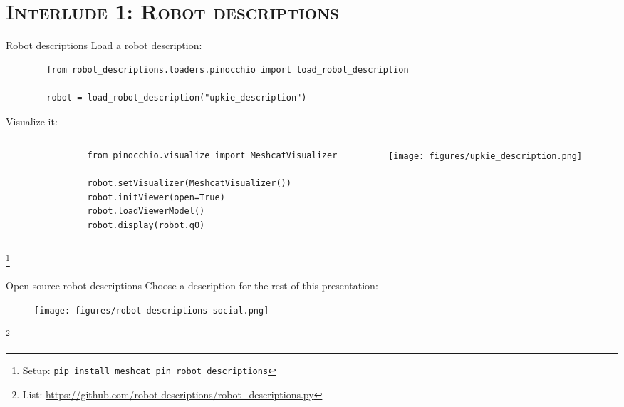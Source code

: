\documentclass[9pt, aspectratio=43]{beamer}
\newcommand\blfootnote[1]{%
  \begingroup
  \renewcommand\thefootnote{}%
  \footnote{#1}%
  \addtocounter{footnote}{-1}%
  \endgroup
}
\begin{document}

\section*{\textsc{Interlude 1: Robot descriptions}}


\begin{frame}[fragile]{Robot descriptions}
    Load a robot description:
    \begin{verbatim}
        from robot_descriptions.loaders.pinocchio import load_robot_description

        robot = load_robot_description("upkie_description")
    \end{verbatim}
    Visualize it:
    \begin{columns}
        \begin{column}{0.75\columnwidth}
            \begin{verbatim}
                from pinocchio.visualize import MeshcatVisualizer

                robot.setVisualizer(MeshcatVisualizer())
                robot.initViewer(open=True)
                robot.loadViewerModel()
                robot.display(robot.q0)
            \end{verbatim}
        \end{column}
        \begin{column}{0.24\columnwidth}
            \begin{figure}
                \centering
                \texttt{[image: figures/upkie\_description.png]}
            \end{figure}
        \end{column}
    \end{columns}
    \blfootnote{
        Setup: \texttt{pip install meshcat pin robot_descriptions}
    }
\end{frame}

\begin{frame}[fragile]{Open source robot descriptions}
    Choose a description for the rest of this presentation:
    \begin{figure}
        \centering
        \texttt{[image: figures/robot-descriptions-social.png]}
    \end{figure}
    \blfootnote{
        List: \url{https://github.com/robot-descriptions/robot_descriptions.py}
    }
\end{frame}
\end{document}
